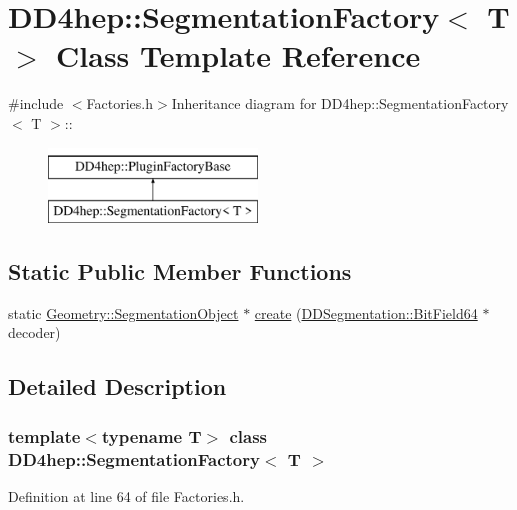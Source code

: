 \hypertarget{class_d_d4hep_1_1_segmentation_factory}{
\section{DD4hep::SegmentationFactory$<$ T $>$ Class Template Reference}
\label{class_d_d4hep_1_1_segmentation_factory}
}


{\ttfamily \#include $<$Factories.h$>$}Inheritance diagram for DD4hep::SegmentationFactory$<$ T $>$::\begin{figure}[H]
\begin{center}
\leavevmode
\includegraphics[height=2cm]{class_d_d4hep_1_1_segmentation_factory}
\end{center}
\end{figure}
\subsection*{Static Public Member Functions}
\begin{DoxyCompactItemize}
\item 
static \hyperlink{class_d_d4hep_1_1_geometry_1_1_segmentation_object}{Geometry::SegmentationObject} $\ast$ \hyperlink{class_d_d4hep_1_1_segmentation_factory_a57196e0678ec341aa3e0463334a723b4}{create} (\hyperlink{class_d_d4hep_1_1_d_d_segmentation_1_1_bit_field64}{DDSegmentation::BitField64} $\ast$decoder)
\end{DoxyCompactItemize}


\subsection{Detailed Description}
\subsubsection*{template$<$typename T$>$ class DD4hep::SegmentationFactory$<$ T $>$}



Definition at line 64 of file Factories.h.

